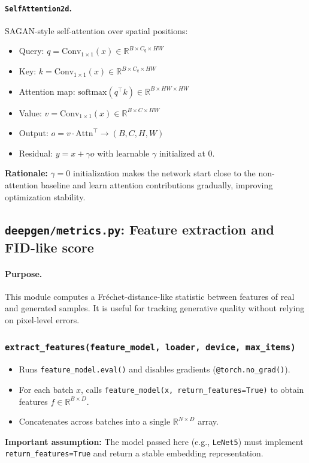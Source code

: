 \paragraph{\texttt{SelfAttention2d}.}
SAGAN-style self-attention over spatial positions:
\begin{itemize}
  \item Query: \(q=\text{Conv}_{1\times1}(x)\in\mathbb{R}^{B\times C_q\times HW}\)
  \item Key: \(k=\text{Conv}_{1\times1}(x)\in\mathbb{R}^{B\times C_q\times HW}\)
  \item Attention map: \(\text{softmax}(q^\top k)\in\mathbb{R}^{B\times HW\times HW}\)
  \item Value: \(v=\text{Conv}_{1\times1}(x)\in\mathbb{R}^{B\times C\times HW}\)
  \item Output: \(o=v\cdot \text{Attn}^\top\rightarrow (B,C,H,W)\)
  \item Residual: \(y=x+\gamma o\) with learnable \(\gamma\) initialized at \(0\).
\end{itemize}
\textbf{Rationale:} \(\gamma=0\) initialization makes the network start close to the non-attention baseline and learn attention contributions gradually, improving optimization stability.

\subsection{\texttt{deepgen/metrics.py}: Feature extraction and FID-like score}
\label{subsec:code_metrics}

\paragraph{Purpose.}
This module computes a Fr\'echet-distance-like statistic between features of real and generated samples. It is useful for tracking generative quality without relying on pixel-level errors.

\subsubsection*{\texttt{extract\_features(feature\_model, loader, device, max\_items)}}
\begin{itemize}
  \item Runs \texttt{feature\_model.eval()} and disables gradients (\texttt{@torch.no\_grad()}).
  \item For each batch \(x\), calls \texttt{feature\_model(x, return\_features=True)} to obtain features \(f\in\mathbb{R}^{B\times D}\).
  \item Concatenates across batches into a single \(\mathbb{R}^{N\times D}\) array.
\end{itemize}
\textbf{Important assumption:} The model passed here (e.g., \texttt{LeNet5}) must implement \texttt{return\_features=True} and return a stable embedding representation.

